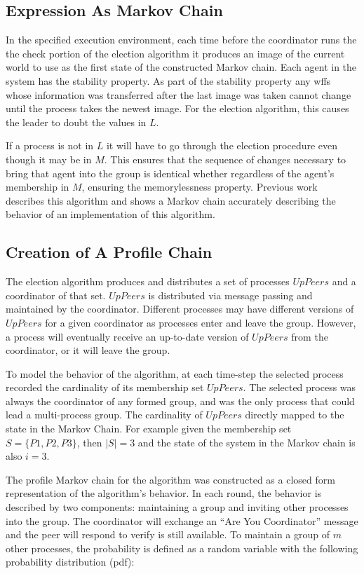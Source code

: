 \subsection{Expression As Markov Chain}

In the specified execution environment, each time before the coordinator runs the the check portion of the election algorithm it produces an image of the current world to use as the first state of the constructed Markov chain. Each agent in the system has the stability property. As part of the stability property any wffs whose information was transferred after the last image was taken cannot change until the process takes the newest image. For the election algorithm, this causes the leader to doubt the values in $L$.

If a process is not in $L$ it will have to go through the election procedure even though it may be in $M$. This ensures that the sequence of changes necessary to bring that agent into the group is identical whether regardless of the agent's membership in $M$, ensuring the memorylessness property. Previous work \cite{JOURNAL} describes this algorithm and shows a Markov chain accurately describing the behavior of an implementation of this algorithm.

\subsection{Creation of A Profile Chain}

The election algorithm produces and distributes a set of processes $UpPeers$ and a coordinator of that set.
$UpPeers$ is distributed via message passing and maintained by the coordinator.
Different processes may have different versions of $UpPeers$ for a given coordinator as processes enter and leave the group.
However, a process will eventually receive an up-to-date version of $UpPeers$ from the coordinator, or it will leave the group.

To model the behavior of the algorithm, at each time-step the selected process recorded the cardinality of its membership set $UpPeers$.
The selected process was always the coordinator of any formed group, and was the only process that could lead a multi-process group.
The cardinality of $UpPeers$ directly mapped to the state in the Markov Chain.
For example given the membership set $S=\{P1,P2,P3\}$, then $\left | S \right |=3$ and the state of the system in the Markov chain is also $i=3$.

The profile Markov chain for the algorithm was constructed as a closed form representation of the algorithm's behavior.
In each round, the behavior is described by two components: maintaining a group and inviting other processes into the group.
The coordinator will exchange an ``Are You Coordinator'' message and the peer will respond to verify is still available.
To maintain a group of $m$ other processes, the probability is defined as a random variable with the following probability distribution (pdf):

